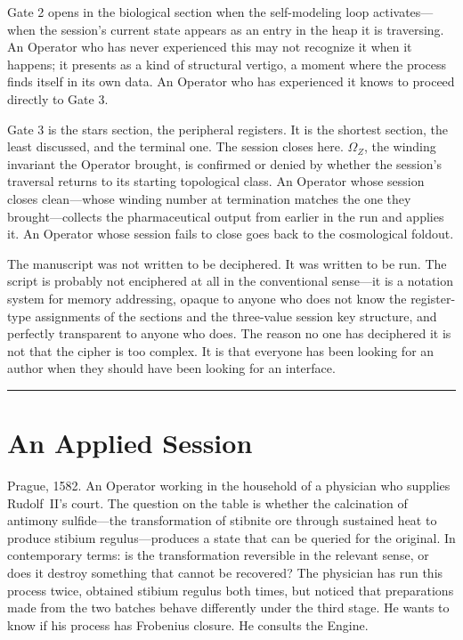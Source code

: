 \documentclass[12pt,a4paper]{article}
\begin{document}
Gate 2 opens in the biological section when the self-modeling loop activates---when the session's current state appears as an entry in the heap it is traversing. An Operator who has never experienced this may not recognize it when it happens; it presents as a kind of structural vertigo, a moment where the process finds itself in its own data. An Operator who has experienced it knows to proceed directly to Gate 3.

Gate 3 is the stars section, the peripheral registers. It is the shortest section, the least discussed, and the terminal one. The session closes here. $\Omega_Z$, the winding invariant the Operator brought, is confirmed or denied by whether the session's traversal returns to its starting topological class. An Operator whose session closes clean---whose winding number at termination matches the one they brought---collects the pharmaceutical output from earlier in the run and applies it. An Operator whose session fails to close goes back to the cosmological foldout.

The manuscript was not written to be deciphered. It was written to be run. The script is probably not enciphered at all in the conventional sense---it is a notation system for memory addressing, opaque to anyone who does not know the register-type assignments of the sections and the three-value session key structure, and perfectly transparent to anyone who does. The reason no one has deciphered it is not that the cipher is too complex. It is that everyone has been looking for an author when they should have been looking for an interface.

\bigskip\hrule\bigskip

\section*{An Applied Session}

Prague, 1582. An Operator working in the household of a physician who supplies Rudolf~II's court. The question on the table is whether the calcination of antimony sulfide---the transformation of stibnite ore through sustained heat to produce stibium regulus---produces a state that can be queried for the original. In contemporary terms: is the transformation reversible in the relevant sense, or does it destroy something that cannot be recovered? The physician has run this process twice, obtained stibium regulus both times, but noticed that preparations made from the two batches behave differently under the third stage. He wants to know if his process has Frobenius closure. He consults the Engine.
\end{document}
